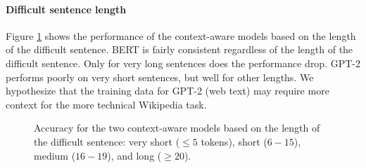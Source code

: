 \documentclass[11pt]{article}
\begin{document}

\paragraph{Difficult sentence length} Figure \ref{fig:length_based} shows the performance of the context-aware models based on the length of the difficult sentence.  BERT is fairly consistent regardless of the length of the difficult sentence.  Only for very long sentences does the performance drop.  GPT-2 performs poorly on very short sentences, but well for other lengths.  We hypothesize that the training data for GPT-2 (web text) may require more context for the more technical Wikipedia task. 

\begin{figure}[t]
\caption{\footnotesize \label{fig:length_based} Accuracy for the two context-aware models based on the length of the difficult sentence: very short ($\le 5$ tokens), short ($6-15$), medium ($16-19$), and long ($\ge20$).}
\end{figure}
\end{document}

